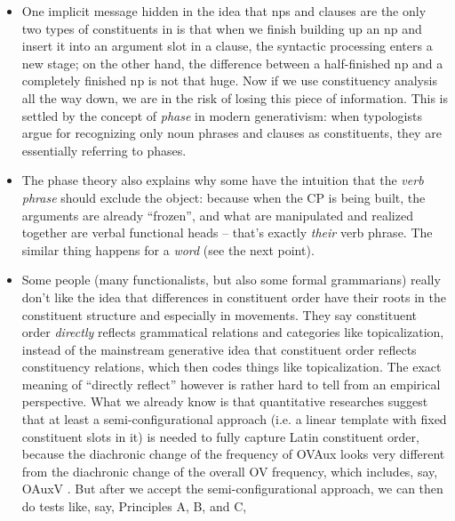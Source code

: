 \documentclass[a4paper, oneside]{report}
\newcommand*{\term}[1]{\emph{#1}}
\begin{document}
\begin{itemize}
    \item One implicit message hidden in the idea that 
        \acs{np}s and clauses are the only two types of constituents 
        in \citet{dixon2009basic1}  
        is that when we finish building up an \acs{np} 
        and insert it into an argument slot in a clause, 
        the syntactic processing enters a new stage;
        on the other hand, the difference between a half-finished \acs{np}
        and a completely finished \acs{np}
        is not that huge.
        Now if we use constituency analysis all the way down, 
        we are in the risk of losing this piece of information.
        This is settled by the concept of \emph{phase} in modern generativism:
        when typologists argue for recognizing only noun phrases and clauses as constituents, 
        they are essentially referring to phases. 
    \item The phase theory also explains why some have the intuition that 
        the \term{verb phrase} should exclude the object: 
        because when the CP is being built, 
        the arguments are already ``frozen'', 
        and what are manipulated and realized together 
        are verbal functional heads -- that's exactly \emph{their} verb phrase. 
        The similar thing happens for a \term{word} (see the next point). 
    \item Some people (many functionalists, but also some formal grammarians) 
        really don't like the idea that 
        differences in constituent order have their roots in 
        the constituent structure and especially in movements. 
        They say constituent order \emph{directly} reflects 
        grammatical relations and categories like topicalization, 
        instead of the mainstream generative idea that 
        constituent order reflects constituency relations,
        which then codes things like topicalization. 
        The exact meaning of ``directly reflect'' however is rather hard to tell 
        from an empirical perspective.
        What we already know is that
        quantitative researches suggest that 
        at least a semi-configurational approach 
        (i.e. a linear template with fixed constituent slots in it)
        is needed to fully capture Latin constituent order, 
        because the diachronic change of the frequency of OVAux
        looks very different from the diachronic change of the overall OV frequency,
        which includes, say, OAuxV \citep{danckaert2015studying}.
        But after we accept the semi-configurational approach, 
        we can then do tests like, say, Principles A, B, and C, 

\end{itemize}
\end{document}
